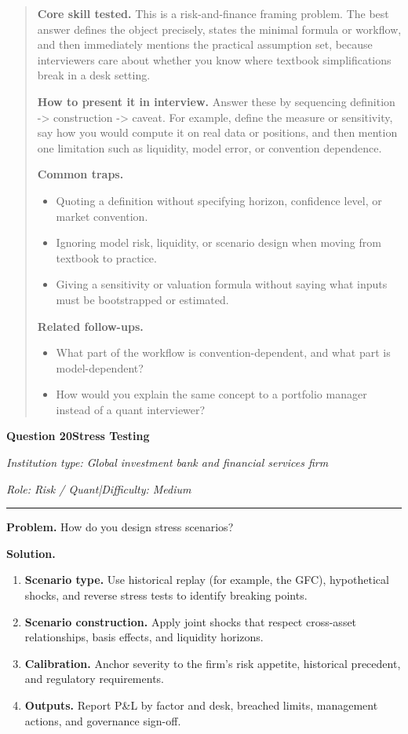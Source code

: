 \documentclass[11pt,letterpaper,openany]{book}
\newenvironment{EditorialNote}
  {\begin{quote}\small\setlength{\parskip}{0.25em}}
  {\end{quote}}
\newcommand{\QuestionSpacer}{\vspace{0.4em}}
\newcommand{\InterviewQuestionHeader}[5]{%
  \vspace{1.0em}%
  {\large\bfseries #1\enspace #4\par}%
  {\small\itshape Institution type: #2\par}%
  {\small\itshape Role: #3\enspace |\enspace Difficulty: #5\par}%
  \vspace{0.25em}\hrule\vspace{0.45em}%
}
\begin{document}
\begin{EditorialNote}


\textbf{Core skill tested.} This is a risk-and-finance framing problem. The best answer defines the object precisely, states the minimal formula or workflow, and then immediately mentions the practical assumption set, because interviewers care about whether you know where textbook simplifications break in a desk setting.

\textbf{How to present it in interview.} Answer these by sequencing definition -> construction -> caveat. For example, define the measure or sensitivity, say how you would compute it on real data or positions, and then mention one limitation such as liquidity, model error, or convention dependence.

\textbf{Common traps.}
\begin{itemize}
\item Quoting a definition without specifying horizon, confidence level, or market convention.
\item Ignoring model risk, liquidity, or scenario design when moving from textbook to practice.
\item Giving a sensitivity or valuation formula without saying what inputs must be bootstrapped or estimated.
\end{itemize}

\textbf{Related follow-ups.}
\begin{itemize}
\item What part of the workflow is convention-dependent, and what part is model-dependent?
\item How would you explain the same concept to a portfolio manager instead of a quant interviewer?
\end{itemize}


\end{EditorialNote}
\QuestionSpacer

\InterviewQuestionHeader{Question 20}{Global investment bank and financial services firm}{Risk / Quant}{Stress Testing}{Medium}
\textbf{Problem.} How do you design stress scenarios?

\textbf{Solution.}

\begin{enumerate}
\item \textbf{Scenario type.} Use historical replay (for example, the GFC), hypothetical shocks, and reverse stress tests to identify breaking points.

\item \textbf{Scenario construction.} Apply joint shocks that respect cross-asset relationships, basis effects, and liquidity horizons.

\item \textbf{Calibration.} Anchor severity to the firm's risk appetite, historical precedent, and regulatory requirements.

\item \textbf{Outputs.} Report P\&L by factor and desk, breached limits, management actions, and governance sign-off.
\end{enumerate}
\end{document}
